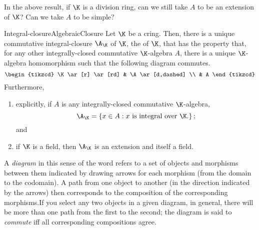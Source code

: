 \begin{exr}{}{}
	In the above result, if $\K$ is a division ring, can we still take $A$ to be an extension of $\K$?  Can we take $A$ to be simple?
\end{exr}
\begin{thm}{Integral-closure}{AlgebraicClosure}
	Let $\K$ be a cring.  Then, there is a unique commutative integral-closure $\A _{\K}$\index[notation]{$\A _{\K}$} of $\K$, the  of $\K$, that has the property that, for any other integrally-closed commutative $\K$-algebra $A$, there is a unique $\K$-algebra homomorphism such that the following diagram commutes.
	\begin{equation}
		\begin{tikzcd}
			\K \ar[r] \ar[rd] & \A \ar[d,dashed] \\
			& A
		\end{tikzcd}
	\end{equation}
	Furthermore,
	\begin{enumerate}
		\item \label{AlgebraicClosure(i)}explicitly, if $A$ is any integrally-closed commutative $\K$-algebra,
		\begin{equation}
			\A _{\K}=\left\{ x\in A:x\text{ is integral over }\K \text{.}\right\} ;
		\end{equation}
		and
		\item \label{AlgebraicClosure(ii)}if $\K$ is a field, then $\A _{\K}$ is an extension and itself a field.
	\end{enumerate}
	\begin{rmk}
		A \emph{diagram} in this sense of the word refers to a set of objects and morphisms between them indicated by drawing arrows for each morphism (from the domain to the codomain).  A path from one object to another (in the direction indicated by the arrows) then corresponds to the composition of the corresponding morphisms.If you select any two objects in a given diagram, in general, there will be more than one path from the first to the second; the diagram is said to \emph{commute} iff all corresponding compositions agree.
		

\end{rmk}
\end{thm}

